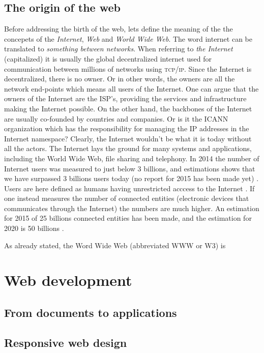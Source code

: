 \documentclass[a4paper,11pt]{kth-mag}
\begin{document}
      \section{The origin of the web}
        Before addressing the birth of the web, lets define the meaning of the the concepets of the \emph{Internet}, \emph{Web} and \emph{World Wide Web}.
        The word internet can be translated to \emph{something between networks}. 
        When referring to \emph{the Internet} (capitalized) it is usually the global decentralized internet used for communication between millions of networks using \textsc{tcp/ip}.
        Since the Internet is decentralized, there is no owner.
        Or in other words, the owners are all the network end-points which means all users of the Internet.
        One can argue that the owners of the Internet are the ISP's, providing the services and infrastructure making the Internet possible.
        On the other hand, the backbones of the Internet are usually co-founded by countries and companies.
        Or is it the ICANN organization which has the responsibility for managing the IP addresses in the Internet namespace?
        Clearly, the Internet wouldn't be what it is today without all the actors.
        The Internet lays the ground for many systems and applications, including the World Wide Web, file sharing and telephony.
        In 2014 the number of Internet users was measured to just below 3 billions, and estimations shows that we have surpassed 3 billions users today (no report for 2015 has been made yet) \cite{internet_live_stats}.
        Users are here defined as humans having unrestricted acccess to the Internet \cite{internet_live_stats}.
        If one instead measures the number of connected entities (electronic devices that communicates through the Internet) the numbers are much higher.
        An estimation for 2015 of 25 billions connected entities has been made, and the estimation for 2020 is 50 billions \cite{internet_of_things}.
        
        As already stated, the Word Wide Web (abbreviated WWW or W3) is 

    \chapter{Web development}
      \section{From documents to applications}
      \section{Responsive web design}
\end{document}
